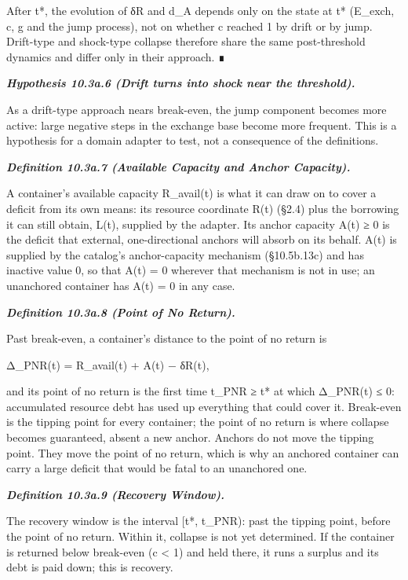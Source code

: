 \documentclass[
]{article}
\begin{document}
After t*, the evolution of δR and d\_A depends only on the state at t*
(E\_exch, c, g and the jump process), not on whether c reached 1 by
drift or by jump. Drift-type and shock-type collapse therefore share the
same post-threshold dynamics and differ only in their approach. ∎

\emph{\textbf{Hypothesis 10.3a.6 (Drift turns into shock near the
threshold).}}

As a drift-type approach nears break-even, the jump component becomes
more active: large negative steps in the exchange base become more
frequent. This is a hypothesis for a domain adapter to test, not a
consequence of the definitions.

\emph{\textbf{Definition 10.3a.7 (Available Capacity and Anchor
Capacity).}}

A container's available capacity R\_avail(t) is what it can draw on to
cover a deficit from its own means: its resource coordinate R(t) (§2.4)
plus the borrowing it can still obtain, L(t), supplied by the adapter.
Its anchor capacity A(t) ≥ 0 is the deficit that external,
one-directional anchors will absorb on its behalf. A(t) is supplied by
the catalog's anchor-capacity mechanism (§10.5b.13c) and has inactive
value 0, so that A(t) = 0 wherever that mechanism is not in use; an
unanchored container has A(t) = 0 in any case.

\emph{\textbf{Definition 10.3a.8 (Point of No Return).}}

Past break-even, a container's distance to the point of no return is

Δ\_PNR(t) = R\_avail(t) + A(t) − δR(t),

and its point of no return is the first time t\_PNR ≥ t* at which
Δ\_PNR(t) ≤ 0: accumulated resource debt has used up everything that
could cover it. Break-even is the tipping point for every container; the
point of no return is where collapse becomes guaranteed, absent a new
anchor. Anchors do not move the tipping point. They move the point of no
return, which is why an anchored container can carry a large deficit
that would be fatal to an unanchored one.

\emph{\textbf{Definition 10.3a.9 (Recovery Window).}}

The recovery window is the interval {[}t*, t\_PNR): past the tipping
point, before the point of no return. Within it, collapse is not yet
determined. If the container is returned below break-even (c \textless{}
1) and held there, it runs a surplus and its debt is paid down; this is
recovery.
\end{document}
